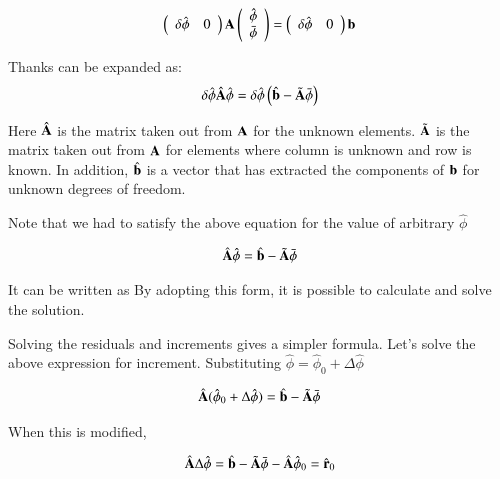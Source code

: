 \begin{eqnarray}
\left(\begin{array}{cc}
\delta\hat{\phi} & 0
\end{array}\right)
\mathbf{A}
\left(\begin{array}{c}
\hat{\phi}\\ \bar{\phi}
\end{array}\right)
 =
\left(\begin{array}{cc}
\delta\hat{\phi} & 0
\end{array}\right)\mathbf{b}
\end{eqnarray}


Thanks can be expanded as:
%
\begin{eqnarray}
\delta\hat{\phi}\hat{\mathbf{A}}\hat{\phi}=\delta\hat{\phi}\left(\hat{\mathbf{b}}-\tilde{\mathbf{A}}\bar{\phi}\right)
\end{eqnarray}



Here $\hat{\mathbf{A}}$ is the matrix taken out from $\mathbf{A}$ for the unknown elements.
%
$\tilde{\mathbf{A}}$ is the matrix taken out from $\mathbf{A}$ for elements where column is unknown and row is known.
%
In addition, $\hat{\mathbf{b}}$ is a vector that has extracted the components of $\mathbf{b}$ for unknown degrees of freedom.

Note that we had to satisfy the above equation for the value of arbitrary $\hat{\phi}$

\begin{eqnarray}
\hat{\mathbf{A}}\hat{\phi}=\hat{\mathbf{b}}-\tilde{\mathbf{A}}\bar{\phi}
\end{eqnarray}


It can be written as By adopting this form, it is possible to calculate and solve the solution.



Solving the residuals and increments gives a simpler formula. Let's solve the above expression for increment.
Substituting $\hat{\phi}=\hat{\phi}_0+\Delta\hat{\phi}$

\begin{eqnarray}
\hat{\mathbf{A}}(\hat{\phi}_0+\Delta\hat{\phi})=\hat{\mathbf{b}}-\tilde{\mathbf{A}}\bar{\phi}
\end{eqnarray}



When this is modified,

\begin{eqnarray}
\hat{\mathbf{A}}\Delta\hat{\phi}=\hat{\mathbf{b}}-\tilde{\mathbf{A}}\bar{\phi} - \hat{\mathbf{A}}\hat{\phi}_0=\hat{\mathbf{r}}_0
\end{eqnarray}



